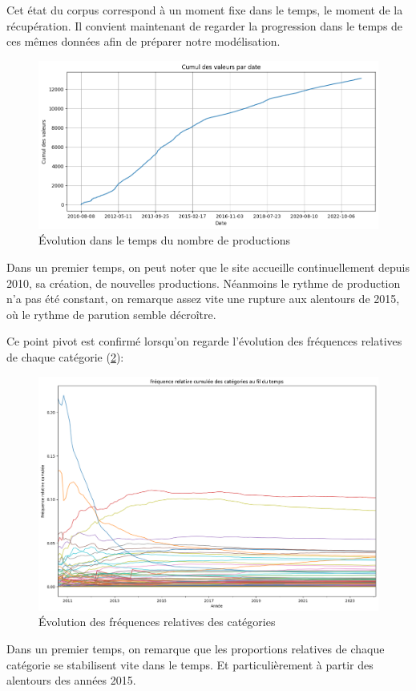 \documentclass[12pt,a4paper,oneside,titlepage]{book} %
\begin{document}
Cet état du corpus correspond à un moment fixe dans le temps, le moment de la récupération. Il convient maintenant de regarder la progression dans le temps de ces mêmes données afin de préparer notre modélisation. 

\begin{figure}
    \centering
    \includegraphics[width=0.5\linewidth]{illustration/evol_gen.png}
    \caption{Évolution dans le temps du nombre de productions}
    \label{fig:prod_temps}
\end{figure}
Dans un premier temps, on peut noter que le site accueille continuellement depuis 2010, sa création,  de nouvelles productions. Néanmoins le rythme de production n'a pas été constant, on remarque assez vite une rupture aux alentours de 2015, où le rythme de parution semble décroître. 

Ce point pivot est confirmé lorsqu'on regarde l'évolution des fréquences relatives de chaque catégorie (\ref{fig:freq_relative_cat}): 
\begin{figure}
    \centering
    \includegraphics[width=0.5\linewidth]{illustration/freq_cat_temps.png}
    \caption{Évolution des fréquences relatives des catégories}
    \label{fig:freq_relative_cat}
\end{figure}

Dans un premier temps, on remarque que les proportions relatives de chaque catégorie se stabilisent vite dans le temps. Et particulièrement à partir des alentours des années 2015. 
\end{document}
